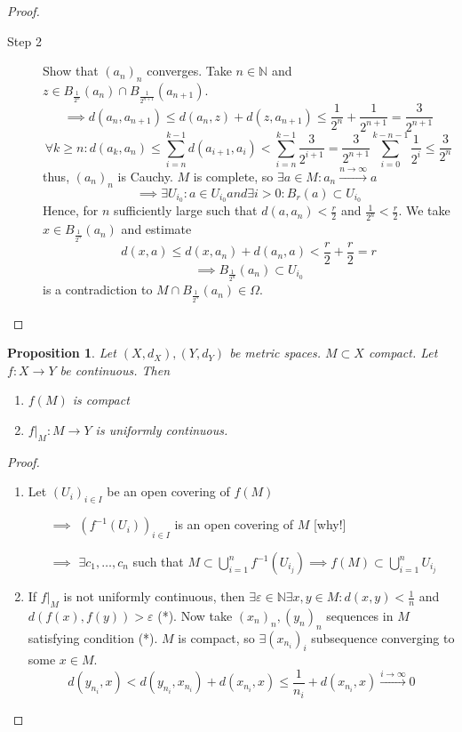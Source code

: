 \documentclass{article}
\newcounter{lecref}[section]
\numberwithin{lecref}{section}
\newtheorem{proposition}[lecref]{Proposition}
\begin{document}
\begin{proof}
\begin{description}
\begin{description}
				\item[Step 2] Show that $(a_n)_n$ converges. Take $n \in \mathbb N$ and $z \in B_{\frac{1}{2^n}}(a_n) \cap B_{\frac{1}{2^{n+1}}}(a_{n+1})$.
					\[ \implies d(a_n, a_{n+1}) \leq d(a_n, z) + d(z, a_{n+1}) \leq \frac{1}{2^n} + \frac{1}{2^{n+1}} = \frac{3}{2^{n+1}} \]
					\[ \forall k \geq n: d(a_k, a_n) \leq \sum_{i=n}^{k-1} d(a_{i+1}, a_i) < \sum_{i=n}^{k-1} \frac{3}{2^{i+1}} = \frac{3}{2^{n+1}} \sum_{i=0}^{k-n-1} \frac{1}{2^i} \leq \frac{3}{2^n} \]
					thus, $(a_n)_n$ is Cauchy. $M$ is complete, so $\exists a \in M: a_n \xrightarrow{n \to \infty} a$
					\[ \implies \exists U_{i_0}: a \in U_{i_0} and \exists i > 0: B_r(a) \subset U_{i_0} \]
					Hence, for $n$ sufficiently large such that $d(a, a_n) < \frac r2$ and $\frac1{2^n} < \frac r2$.
					We take $x \in B_{\frac1{2^n}}(a_n)$ and estimate 
					\[ d(x, a) \leq d(x, a_n) + d(a_n, a) < \frac r2 + \frac r2 = r \]
					\[ \implies B_{\frac{1}{2^n}}(a_n) \subset U_{i_0} \]
					is a contradiction to $M \cap B_{\frac1{2^n}}(a_n) \in \Omega$.
			\end{description}
	\end{description}
\end{proof}

\begin{proposition}
	\label{proposition:1.20}
	Let $(X, d_X), (Y, d_Y)$ be metric spaces. $M \subset X$ compact. Let $f: X \to Y$ be continuous. Then
	\begin{enumerate}
		\item $f(M)$ is compact
		\item $f|_M: M \to Y$ is uniformly continuous.
	\end{enumerate}
\end{proposition}

\begin{proof}
	\begin{enumerate}
		\item Let $(U_i)_{i \in I}$ be an open covering of $f(M)$
			\begin{enumerate}
				\item[$\implies$] $(f^{-1}(U_i))_{i \in I}$ is an open covering of $M$ [why!]
				\item[$\implies$] $\exists c_1, \dots, c_n$ such that $M \subset \bigcup_{i=1}^n f^{-1}(U_{i_j}) \implies f(M) \subset \bigcup_{i=1}^n U_{i_j}$
			\end{enumerate}
		\item If $f|_M$ is not uniformly continuous, then $\exists \varepsilon \in \mathbb N \exists x, y \in M: d(x, y) < \frac1n$ and $d(f(x), f(y)) > \varepsilon$ (*).
			Now take $(x_n)_n, (y_n)_n$ sequences in $M$ satisfying condition (*).
			$M$ is compact, so $\exists (x_{n_i})_{i}$ subsequence converging to some $x \in M$.
			\[ d(y_{n_i}, x) < d(y_{n_i}, x_{n_i}) + d(x_{n_i}, x) \leq \frac{1}{n_i} + d(x_{n_i}, x) \xrightarrow{i \to \infty} 0 \]
	\end{enumerate}
\end{proof}
\end{document}
